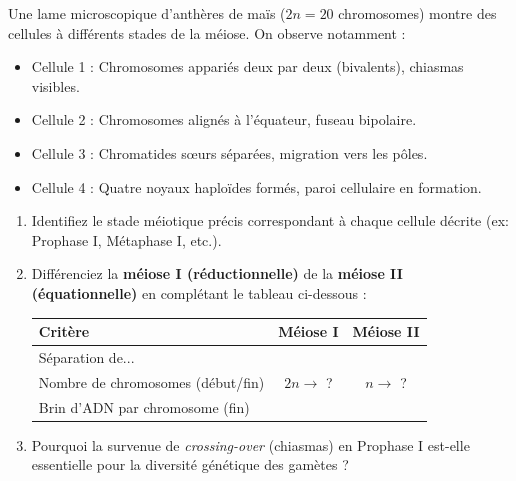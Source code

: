 \documentclass[11pt]{article}
\begin{document}
\begin{exercice}
Une lame microscopique d'anthères de maïs ($2n = 20$ chromosomes) montre des cellules à différents stades de la méiose. On observe notamment :
\begin{itemize}
    \item Cellule 1 : Chromosomes appariés deux par deux (bivalents), chiasmas visibles.
    \item Cellule 2 : Chromosomes alignés à l'équateur, fuseau bipolaire.
    \item Cellule 3 : Chromatides sœurs séparées, migration vers les pôles.
    \item Cellule 4 : Quatre noyaux haploïdes formés, paroi cellulaire en formation.
\end{itemize}
\begin{enumerate}
    \item Identifiez le stade méiotique précis correspondant à chaque cellule décrite (ex: Prophase I, Métaphase I, etc.).
    \item Différenciez la \textbf{méiose I (réductionnelle)} de la \textbf{méiose II (équationnelle)} en complétant le tableau ci-dessous :
    \begin{tabular}{|l|c|c|}
    \hline
    \textbf{Critère} & \textbf{Méiose I} & \textbf{Méiose II} \\ \hline
    Séparation de... & & \\ \hline
    Nombre de chromosomes (début/fin) & $2n \rightarrow$ ? & $n \rightarrow$ ? \\ \hline
    Brin d'ADN par chromosome (fin) & & \\ \hline
    \end{tabular}
    \item Pourquoi la survenue de \textit{crossing-over} (chiasmas) en Prophase I est-elle essentielle pour la diversité génétique des gamètes ?
\end{enumerate}
\end{exercice}
\end{document}
